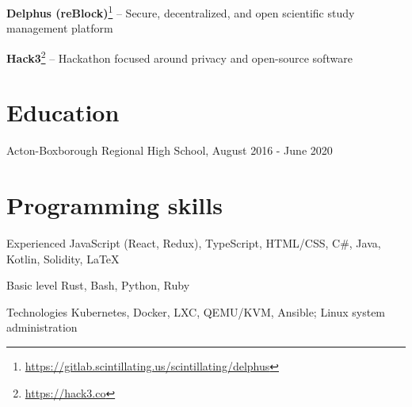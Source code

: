 \documentclass[paper=letter]{tccv}
\begin{document}
\textbf{Delphus (reBlock)}\footnote{\url{https://gitlab.scintillating.us/scintillating/delphus}} -- Secure, decentralized, and open scientific study management platform

\textbf{Hack3}\footnote{\url{https://hack3.co}} -- Hackathon focused around privacy and open-source software

\textbf{}

\section{Education}

Acton-Boxborough Regional High School, August 2016 - June 2020

\section{Programming skills}

\begin{factlist}

\item{Experienced}
     {JavaScript (React, Redux), TypeScript, HTML/CSS, C\#, Java, Kotlin, Solidity, \LaTeX}

\item{Basic level}
     {Rust, Bash, Python, Ruby}

\item{Technologies}
     {Kubernetes, Docker, LXC, QEMU/KVM, Ansible; Linux system administration}

\end{factlist}
\end{document}
